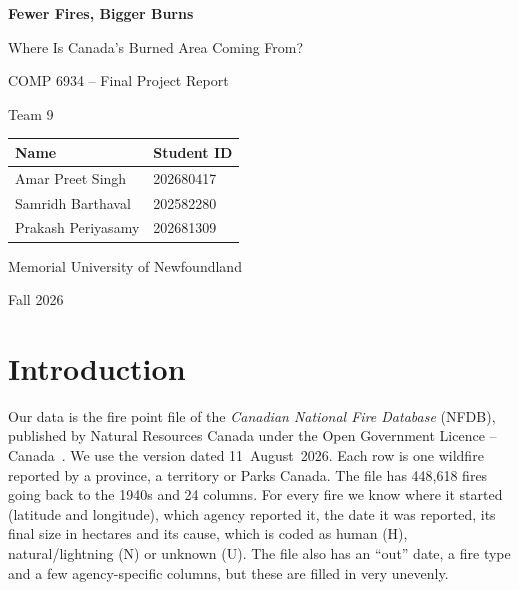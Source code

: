 \documentclass[12pt]{article}
\begin{document}
\begin{titlepage}
\centering
\vspace*{3cm}
{\LARGE\bfseries Fewer Fires, Bigger Burns\par}
\vspace{0.4cm}
{\Large Where Is Canada's Burned Area Coming From?\par}
\vspace{1.5cm}
{\large COMP 6934 -- Final Project Report\par}
{\large Team 9\par}
\vspace{2cm}
\begin{tabular}{ll}
\toprule
\textbf{Name} & \textbf{Student ID} \\
\midrule
Amar Preet Singh    & 202680417 \\
Samridh Barthaval   & 202582280 \\
Prakash Periyasamy  & 202681309 \\
\bottomrule
\end{tabular}
\vfill
{\large Memorial University of Newfoundland\par}
{\large Fall 2026\par}
\end{titlepage}

\section{Introduction}

Our data is the fire point file of the \emph{Canadian National Fire Database}
(NFDB), published by Natural Resources Canada under the Open Government
Licence -- Canada~\cite{nfdb}. We use the version dated 11~August~2026. Each row
is one wildfire reported by a province, a territory or Parks Canada. The file
has 448,618 fires going back to the 1940s and 24 columns. For every fire we
know where it started (latitude and longitude), which agency reported it, the
date it was reported, its final size in hectares and its cause, which is
coded as human (H), natural/lightning (N) or unknown (U). The file also has an
``out'' date, a fire type and a few agency-specific columns, but these are
filled in very unevenly.
\end{document}
